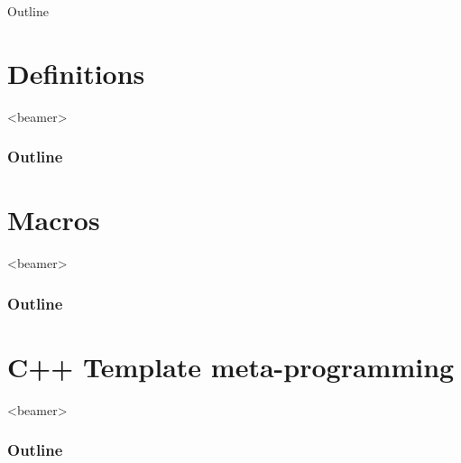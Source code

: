 \documentclass[notes=hide,xcolor=svgnames,professionalfonts,lualatex]{beamer}
\begin{document}
\begin{frame}{Outline}
  \begin{tikzpicture}[]
  \end{tikzpicture}
  \tableofcontents
\addtocounter{framenumber}{-1}
\end{frame}


\section{Definitions}
\begin{frame}<beamer>                                                                                                                    
    \frametitle{Outline}
    \tableofcontents[currentsection]
\end{frame}


\section{Macros}
\begin{frame}<beamer>                                                                                                                    
    \frametitle{Outline}
    \tableofcontents[currentsection]
\end{frame}


\section{C++ Template meta-programming}
\begin{frame}<beamer>                                                                                                                    
    \frametitle{Outline}
    \tableofcontents[currentsection]
\end{frame}

\end{document}
